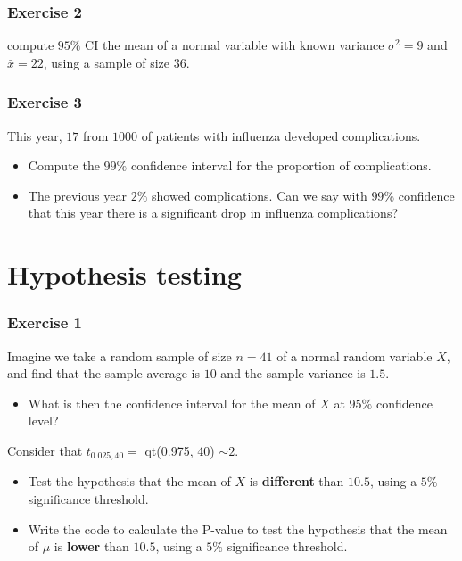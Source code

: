 \documentclass[
]{book}
\providecommand{\tightlist}{%
  \setlength{\itemsep}{0pt}\setlength{\parskip}{0pt}}
\begin{document}
\hypertarget{exercise-2-9}{%
\subsubsection{Exercise 2}\label{exercise-2-9}}

compute \(95\%\) CI the mean of a normal variable with known variance \(\sigma^2=9\) and \(\bar{x}=22\), using a sample of size \(36\).

\hypertarget{exercise-3-6}{%
\subsubsection{Exercise 3}\label{exercise-3-6}}

This year, \(17\) from \(1000\) of patients with influenza developed complications.

\begin{itemize}
\item
  Compute the \(99\%\) confidence interval for the proportion of complications.
\item
  The previous year \(2\%\) showed complications. Can we say with \(99\%\) confidence that this year there is a significant drop in influenza complications?
\end{itemize}

\hypertarget{hypothesis-testing-7}{%
\section{Hypothesis testing}\label{hypothesis-testing-7}}

\hypertarget{exercise-1-10}{%
\subsubsection{Exercise 1}\label{exercise-1-10}}

Imagine we take a random sample of size \(n = 41\) of a normal random variable \(X\), and find that the sample average is \(10\) and the sample variance is \(1.5\).

\begin{itemize}
\tightlist
\item
  What is then the confidence interval for the mean of \(X\) at \(95\%\) confidence level?
\end{itemize}

Consider that \(t_{0.025,40}=\) qt(0.975, 40) \(\sim 2\).

\begin{itemize}
\item
  Test the hypothesis that the mean of \(X\) is \textbf{different} than \(10.5\), using a \(5\%\) significance threshold.
\item
  Write the code to calculate the P-value to test the hypothesis that the mean of \(\mu\) is \textbf{lower} than \(10.5\), using a \(5\%\) significance threshold.
\end{itemize}
\end{document}
